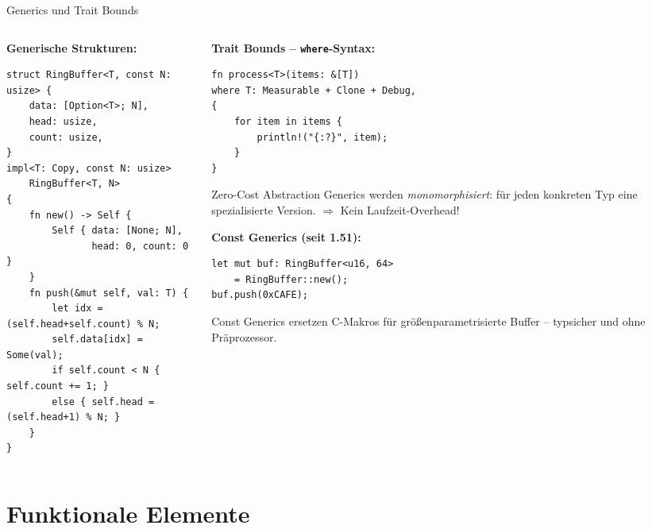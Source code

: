 \documentclass[%
  aspectratio=169,
  10pt
]{beamer}
\begin{document}
\begin{frame}[fragile]{Generics und Trait Bounds}
  \begin{columns}[T]
    \begin{column}{0.50\textwidth}
      \textbf{Generische Strukturen:}
\begin{lstlisting}
struct RingBuffer<T, const N: usize> {
    data: [Option<T>; N],
    head: usize,
    count: usize,
}
impl<T: Copy, const N: usize>
    RingBuffer<T, N>
{
    fn new() -> Self {
        Self { data: [None; N],
               head: 0, count: 0 }
    }
    fn push(&mut self, val: T) {
        let idx = (self.head+self.count) % N;
        self.data[idx] = Some(val);
        if self.count < N { self.count += 1; }
        else { self.head = (self.head+1) % N; }
    }
}
\end{lstlisting}
    \end{column}
    \begin{column}{0.47\textwidth}
      \textbf{Trait Bounds -- \texttt{where}-Syntax:}
\begin{lstlisting}
fn process<T>(items: &[T])
where T: Measurable + Clone + Debug,
{
    for item in items {
        println!("{:?}", item);
    }
}
\end{lstlisting}
      \begin{block}{Zero-Cost Abstraction}
        \small Generics werden \emph{monomorphisiert}: für jeden
        konkreten Typ eine spezialisierte Version.
        $\Rightarrow$ Kein Laufzeit-Overhead!
      \end{block}
      \textbf{Const Generics (seit 1.51):}
\begin{lstlisting}
let mut buf: RingBuffer<u16, 64>
    = RingBuffer::new();
buf.push(0xCAFE);
\end{lstlisting}
      {\small Const Generics ersetzen C-Makros
      für größenparametrisierte Buffer --
      typsicher und ohne Präprozessor.}
    \end{column}
  \end{columns}
\end{frame}

\section{Funktionale Elemente}
\end{document}
